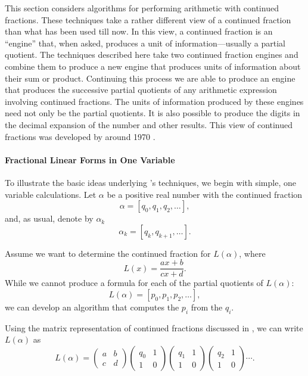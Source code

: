 This section considers algorithms for performing arithmetic with
continued fractions.  These techniques take a rather different view of
a continued fraction than what has been used till now.  In this view,
a continued fraction is an ``engine'' that, when asked, produces a
unit of information---usually a partial quotient.  The techniques
described here take two continued fraction engines and combine them to
produce a new engine that produces units of information about their
sum or product.  Continuing this process we are able to produce an
engine that produces the successive partial quotients of any
arithmetic expression involving continued fractions.  The units of
information produced by these engines need not only be the partial
quotients.  It is also possible to produce the digits in the decimal
expansion of the number and other results.  This view of continued
fractions was developed by {\Gosper} around 1970 \cite{Beeler1972-ab}.

\paragraph{Fractional Linear Forms in One Variable}

To illustrate the basic ideas underlying {\Gosper}'s techniques, we
begin with simple, one variable calculations.  Let $\alpha$ be a
positive real number with the continued fraction
\[
\alpha = [q_0, q_1, q_2, \ldots],
\]
and, as usual, denote by $\alpha_k$
\[
\alpha_k = [q_k, q_{k+1}, \ldots].
\]

Assume we want to determine the continued fraction for $L(\alpha)$, where
\begin{equation}
L(x) = \frac{ax + b}{cx + d}.
\label{BiLinear:Eq}
\end{equation}
While we cannot produce a formula for each of the partial
quotients of $L(\alpha)$:
\[L(\alpha) = [p_0, p_1, p_2, \ldots],
\]
we can develop an algorithm that computes the $p_i$ from the $q_i$.

Using the matrix representation of continued fractions discussed in
, we can write $L(\alpha)$ as
\[
L(\alpha) = \begin{pmatrix}a&b\\ c&d\end{pmatrix} \begin{pmatrix}q_0&1\\ 1&0\end{pmatrix}
\begin{pmatrix}q_1&1\\ 1&0\end{pmatrix} \begin{pmatrix}q_2&1\\ 1&0\end{pmatrix} \cdots.
\]

